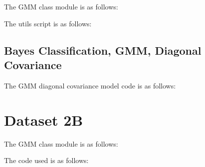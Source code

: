 \documentclass[11pt,a4paper]{article}
\newcommand{\noi}{\noindent}
\begin{document}
\noi
The GMM class module is as follows:\vspace{-1em}


\noi
The utils script is as follows:\vspace{-1em}



\subsection{Bayes Classification, GMM, Diagonal Covariance}
The GMM diagonal covariance model code is as follows: \vspace{-1em}


\section{Dataset 2B}
The GMM class module is as follows:\vspace{-1em}


The code used is as follows:\vspace{-1em}

\end{document}
